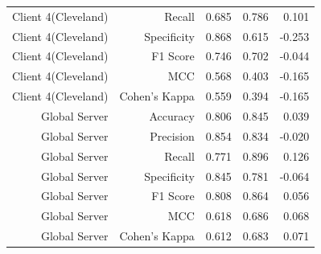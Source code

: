 \begin{table}[t]
\begin{tabular}{rrrrr}
Client 4(Cleveland) & Recall & 0.685 & 0.786 & 0.101 \\
Client 4(Cleveland) & Specificity & 0.868 & 0.615 & -0.253 \\
Client 4(Cleveland) & F1 Score & 0.746 & 0.702 & -0.044 \\
Client 4(Cleveland) & MCC & 0.568 & 0.403 & -0.165 \\
Client 4(Cleveland) & Cohen's Kappa & 0.559 & 0.394 & -0.165 \\
Global Server & Accuracy & 0.806 & 0.845 & 0.039 \\
Global Server & Precision & 0.854 & 0.834 & -0.020 \\
Global Server & Recall & 0.771 & 0.896 & 0.126 \\
Global Server & Specificity & 0.845 & 0.781 & -0.064 \\
Global Server & F1 Score & 0.808 & 0.864 & 0.056 \\
Global Server & MCC & 0.618 & 0.686 & 0.068 \\
Global Server & Cohen's Kappa & 0.612 & 0.683 & 0.071 \\
\bottomrule
\end{tabular}
\end{table}
